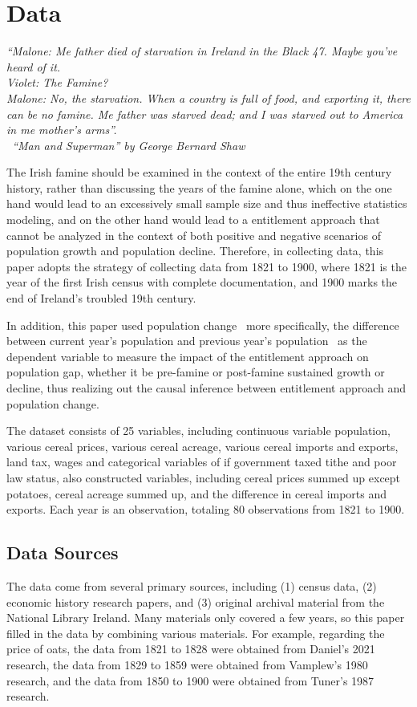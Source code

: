 \chapter{Data}

\textit{``Malone: Me father died of starvation in Ireland in the Black 47. Maybe you've heard of it.\\
Violet: The Famine?\\
Malone: No, the starvation. When a country is full of food, and exporting it, there can be no famine. Me father was starved dead; and I was starved out to America in me mother's arms''.\\
\textemdash\ ``Man and Superman'' by George Bernard Shaw
}
\vspace{.2cm}

The Irish famine should be examined in the context of the entire 19th century history, rather than discussing the years of the famine alone, which on the one hand would lead to an excessively small sample size and thus ineffective statistics modeling, and on the other hand would lead to a entitlement approach that cannot be analyzed in the context of both positive and negative scenarios of population growth and population decline. Therefore, in collecting data, this paper adopts the strategy of collecting data from 1821 to 1900, where 1821 is the year of the first Irish census with complete documentation, and 1900 marks the end of Ireland's troubled 19th century.

In addition, this paper used population change \textendash\ more specifically, the difference between current year's population and previous year's population \textendash\ as the dependent variable to measure the impact of the entitlement approach on population gap, whether it be pre-famine or post-famine sustained growth or decline, thus  realizing out the causal inference between entitlement approach and population change.

The dataset consists of 25 variables, including continuous variable population, various cereal prices, various cereal acreage, various cereal imports and exports, land tax, wages and categorical variables of if government taxed tithe and poor law status, also constructed variables, including cereal prices summed up except potatoes, cereal acreage summed up, and the difference in cereal imports and exports. Each year is an observation, totaling 80 observations from 1821 to 1900.

\section{Data Sources}
\vspace{0pt}
The data come from several primary sources, including (1) census data, (2) economic history research papers, and (3) original archival material from the National Library Ireland. Many materials only covered a few years, so this paper filled in the data by combining various materials. For example, regarding the price of oats, the data from 1821 to 1828 were obtained from Daniel's 2021 research, the data from 1829 to 1859 were obtained from Vamplew's 1980 research, and the data from 1850 to 1900 were obtained from Tuner's 1987 research. 

